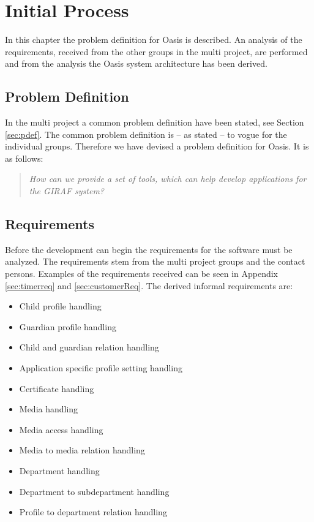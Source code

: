 \chapter{Initial Process}
In this chapter the problem definition for Oasis is described.
An analysis of the requirements, received from the other groups in the multi project, are performed and from the analysis the Oasis system architecture has been derived.

\section{Problem Definition}
\label{sec:OasisProblemDefinition}
In the multi project a common problem definition have been stated, see Section \vref{sec:pdef}. The common problem definition is -- as stated -- to vogue for the individual groups. Therefore we have devised a problem definition for Oasis.
It is as follows:

\begin{quotation}
	\textit{How can we provide a set of tools, which can help develop applications for the GIRAF system?}
\end{quotation}

\section{Requirements}
Before the development can begin the requirements for the software must be analyzed.
The requirements stem from the multi project groups and the contact persons.
Examples of the requirements received can be seen in Appendix \vref{sec:timerreq} and \vref{sec:customerReq}.
\newpage
The derived informal requirements are:
\begin{itemize}
	\item Child profile handling
	\item Guardian profile handling
	\item Child and guardian relation handling
	\item Application specific profile setting handling
	\item Certificate handling
	\item Media handling
	\item Media access handling
	\item Media to media relation handling
	\item Department handling
	\item Department to subdepartment handling
	\item Profile to department relation handling
\end{itemize}

